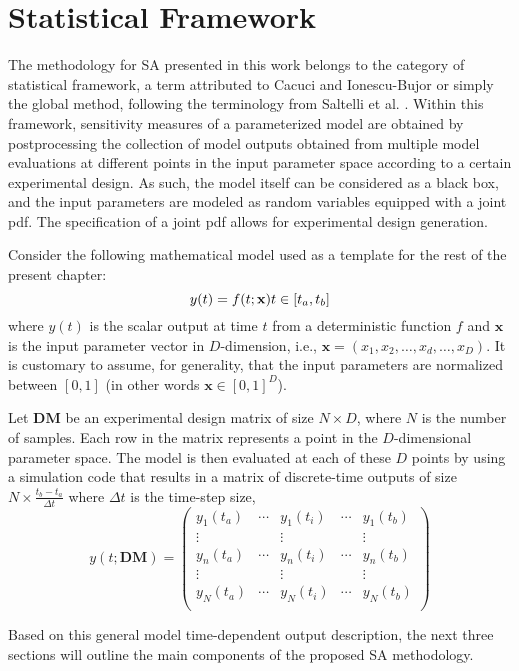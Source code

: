 \section{Statistical Framework}\label{sec:sa_statistical_framework}

The methodology for SA presented in this work belongs to
the category of statistical framework, a term attributed
to Cacuci and Ionescu-Bujor \cite{Ionescu-Bujor2004} or simply the global
method, following the terminology from Saltelli et al. \cite{Saltelli2004}.
Within this framework, sensitivity measures of a parameterized
model are obtained by postprocessing the collection
of model outputs obtained from multiple model
evaluations at different points in the input parameter space
according to a certain experimental design. 
As such, the model itself can be considered as a black box, 
and the input parameters are modeled as random variables
equipped with a joint pdf. 
The specification of a joint pdf allows for experimental design generation.

Consider the following mathematical model used as a template for the rest of the present chapter:
\begin{equation}
y(t) = f(t;\mathbf{x}) \bigskip t \in [t_a,t_b]
\end{equation}
where $y(t)$ is the scalar output at time $t$ from a deterministic
function $f$ and $\mathbf{x}$ is the input parameter vector in
$D$-dimension, i.e., $\mathbf{x} = (x_1, x_2, \dots , x_d, \dots , x_D)$.
It is customary to assume, for generality, that the input parameters are normalized between $[0,1]$ (in other words $\mathbf{x} \in [0,1]^D$).

Let $\mathbf{DM}$ be an experimental design matrix of size
$N \times D$, where $N$ is the number of samples. 
Each row in the matrix represents a point in the $D$-dimensional parameter space. 
The model is then evaluated at each of these $D$ points by using a simulation code that results in a matrix of discrete-time outputs of size $N\times \frac{t_b-t_a}{\Delta t}$ where $\Delta t$ is the time-step size,
\begin{equation}
y(t; \mathbf{DM}) = 
\begin{pmatrix}
y_1(t_a)  & \cdots & y_1(t_i) & \cdots & y_1(t_b)\\
\vdots	  &        & \vdots   &        & \vdots\\
y_n(t_a)  & \cdots & y_n(t_i) & \cdots & y_n(t_b)\\
\vdots	  &        & \vdots   &        & \vdots\\
y_N(t_a)  & \cdots & y_N(t_i) & \cdots & y_N(t_b) \\
\end{pmatrix}
\end{equation}

Based on this general model time-dependent output description, 
the next three sections will outline the main components of the proposed SA methodology.
